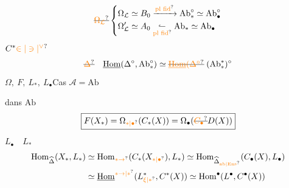 \[
\deleted{\unsure{\Omega_{\mathcal L}}}\left\{\begin{aligned}
\Omega_{\mathcal L}&\simeq B_0 \xrightarrow{\unsure{\text{pl fid}}} \mathrm{Ab}_*^\circ \simeq\mathrm{Ab}_{\bullet}^{\circ}\\
\Omega'_{\mathcal L}&\simeq A_0 \mathrel{\underset{\unsure{\text{pl fid}}}{\lhook\joinrel\relbar}} \mathrm{Ab}_*\simeq\mathrm{Ab}_{\bullet}
\end{aligned}\right.
\]
\(C^*\unsure{\in|\ni|{}^\vee}\)
\[
\deleted{\unsure{\Delta}}\quad\underline{\mathrm{Hom}}(\Delta^\circ,\mathrm{Ab}_*^\circ)\simeq
\deleted{\unsure{\underline{\mathrm{Hom}}(\Delta^\circ}}\;(\mathrm{Ab}^{*}_{*})^\circ
\]
\(\Omega,\ F,\ L_*,\ L_{\bullet}\)\qquad Cas \(\mathcal A=\mathrm{Ab}\)

  dans \(\mathrm{Ab}\)
\[
\boxed{F(X_*)=\Omega_{\unsure{*|\bullet}}(C_*(X))=\Omega_{\bullet}(\deleted{\unsure{C_{\bullet}}}D(X))}
\]
\(L_\bullet\quad L_*\)
\[
\begin{aligned}
\mathrm{Hom}_{\widehat{\Delta}}(X_*,L_*)&\simeq\mathrm{Hom}_{\unsure{*{\to}}}(C_*(X_{\unsure{*|\bullet}}),L_*)\simeq\mathrm{Hom}_{\widehat{\Delta}_{\unsure{\rm ab|\mathrm{Ens}}}}(C_{\bullet}(X),L_{\bullet})\\
&\simeq\underline{\mathrm{Hom}}^{\unsure{*{\to}|*}}(L_{\unsure{\xi|*}}^*,C^*(X))\simeq\mathrm{Hom}^{\bullet}(L^{\bullet},C^{\bullet}(X))
\end{aligned}
\]

